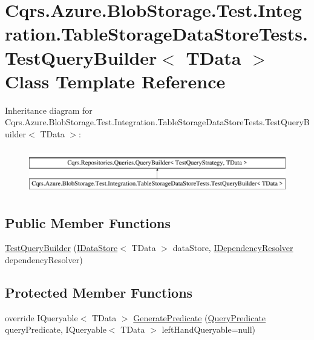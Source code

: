 \hypertarget{classCqrs_1_1Azure_1_1BlobStorage_1_1Test_1_1Integration_1_1TableStorageDataStoreTests_1_1TestQueryBuilder}{}\section{Cqrs.\+Azure.\+Blob\+Storage.\+Test.\+Integration.\+Table\+Storage\+Data\+Store\+Tests.\+Test\+Query\+Builder$<$ T\+Data $>$ Class Template Reference}
\label{classCqrs_1_1Azure_1_1BlobStorage_1_1Test_1_1Integration_1_1TableStorageDataStoreTests_1_1TestQueryBuilder}
Inheritance diagram for Cqrs.\+Azure.\+Blob\+Storage.\+Test.\+Integration.\+Table\+Storage\+Data\+Store\+Tests.\+Test\+Query\+Builder$<$ T\+Data $>$\+:\begin{figure}[H]
\begin{center}
\leavevmode
\includegraphics[height=1.961471cm]{classCqrs_1_1Azure_1_1BlobStorage_1_1Test_1_1Integration_1_1TableStorageDataStoreTests_1_1TestQueryBuilder}
\end{center}
\end{figure}
\subsection*{Public Member Functions}
\begin{DoxyCompactItemize}
\item 
\hyperlink{classCqrs_1_1Azure_1_1BlobStorage_1_1Test_1_1Integration_1_1TableStorageDataStoreTests_1_1TestQueryBuilder_ada46a3061a76cebf70f07e5286c73f85_ada46a3061a76cebf70f07e5286c73f85}{Test\+Query\+Builder} (\hyperlink{interfaceCqrs_1_1DataStores_1_1IDataStore}{I\+Data\+Store}$<$ T\+Data $>$ data\+Store, \hyperlink{interfaceCqrs_1_1Configuration_1_1IDependencyResolver}{I\+Dependency\+Resolver} dependency\+Resolver)
\end{DoxyCompactItemize}
\subsection*{Protected Member Functions}
\begin{DoxyCompactItemize}
\item 
override I\+Queryable$<$ T\+Data $>$ \hyperlink{classCqrs_1_1Azure_1_1BlobStorage_1_1Test_1_1Integration_1_1TableStorageDataStoreTests_1_1TestQueryBuilder_a4b65d9a13c425df0aa5bd309fc1824de_a4b65d9a13c425df0aa5bd309fc1824de}{Generate\+Predicate} (\hyperlink{classCqrs_1_1Repositories_1_1Queries_1_1QueryPredicate}{Query\+Predicate} query\+Predicate, I\+Queryable$<$ T\+Data $>$ left\+Hand\+Queryable=null)
\end{DoxyCompactItemize}
